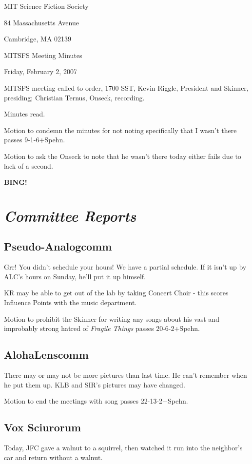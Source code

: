 \documentclass[10pt]{article}
\newcommand{\bing}{{\bf BING!} }
\newcommand{\goto}[1]{\bing \vskip 12pt \section*{{\em{#1}}}}
\begin{document}
\begin{center}

MIT Science Fiction Society

84 Massachusetts Avenue

Cambridge, MA 02139

\vspace{12pt}

MITSFS Meeting Minutes

Friday, February 2, 2007

\end{center}

\vspace{18pt}

\setlength{\parskip}{6pt}

\noindent
MITSFS meeting called to order, 1700 SST,
Kevin Riggle, President and Skinner, presiding; Christian Ternus, Onseck, recording.

Minutes read.

Motion to condemn the minutes for not noting specifically that I wasn't there passes 9-1-6+Spehn.

Motion to ask the Onseck to note that he wasn't there today either fails due to lack of a second.

\goto{Committee Reports}

\subsection*{Pseudo-Analogcomm}
Grr!  You didn't schedule your hours!  We have a partial schedule.  If it isn't up by ALC's hours on Sunday, he'll put it up himself.

KR may be able to get out of the lab by taking Concert Choir - this scores Influence Points with the music department.

Motion to prohibit the Skinner for writing any songs about his vast and improbably strong hatred of \emph{Fragile Things} passes 20-6-2+Spehn.

\subsection*{AlohaLenscomm}
There may or may not be more pictures than last time.  He can't remember when he put them up.  KLB and SIR's pictures may have changed.

Motion to end the meetings with song passes 22-13-2+Spehn.

\subsection*{Vox Sciurorum}
Today, JFC gave a walnut to a squirrel, then watched it run into the neighbor's car and return without a walnut. 
\end{document}
